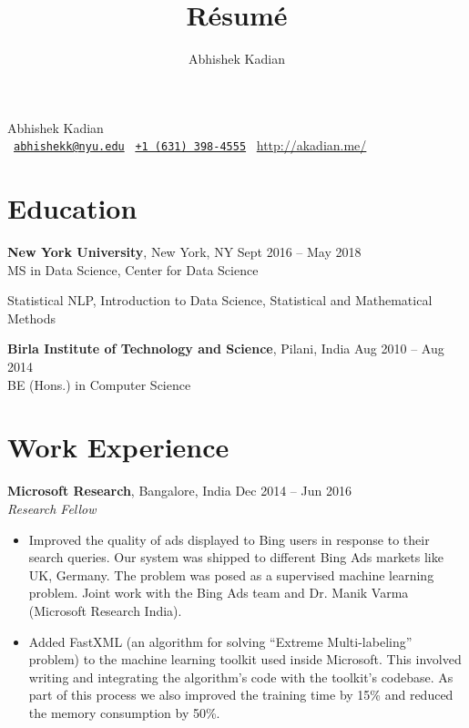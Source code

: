 \documentclass[letterpaper]{article}
\title{R\'esum\'e}
\author{Abhishek Kadian}
\begin{document}
\pagecolor{white}
\begin{center}
\huge
Abhishek Kadian\\
\small
\faEnvelope~\href{mailto:abhishekk@nyu.edu}{\nolinkurl{abhishekk@nyu.edu}}
\faPhone~\href{tel:16313984555}{\texttt{+1 (631) 398-4555}}
\faGlobe~\url{http://akadian.me/}
\normalsize
\end{center}

\section*{Education}
\vspace{-1mm}
\textbf{New York University}, New York, NY \hfill Sept 2016 --
    May 2018\\
MS in Data Science, Center for Data Science
\vspace{-2mm}
\begin{description}[leftmargin=!, labelwidth=\widthof{Coursework },
        font=\normalfont]
    \item[Coursework:] Statistical NLP,
                        Introduction to Data Science, Statistical and Mathematical Methods
\end{description}
\vspace{-0.5mm}
\textbf{Birla Institute of Technology and Science}, Pilani, India \hfill
    Aug 2010 -- Aug 2014\\
BE (Hons.) in Computer Science

\section*{Work Experience}
\textbf{Microsoft Research}, Bangalore, India \hfill Dec 2014 -- Jun 2016\\
\emph{Research Fellow}\\
\vspace{-6mm}
\begin{itemize}
\item Improved the quality of ads displayed to Bing users in response to their search queries. Our system was shipped
to different Bing Ads markets like UK, Germany. The problem was posed as a supervised machine learning problem. Joint
work with the Bing Ads team and Dr. Manik Varma (Microsoft Research India).
\vspace{-2mm}
\item Added FastXML (an algorithm for solving ``Extreme Multi-labeling'' problem) to the machine
learning toolkit used inside Microsoft. This involved writing and integrating the algorithm's code
with the toolkit's codebase. As part of this process we also improved the training time by 15\% and reduced the
memory consumption by 50\%.
\end{itemize}
\end{document}

